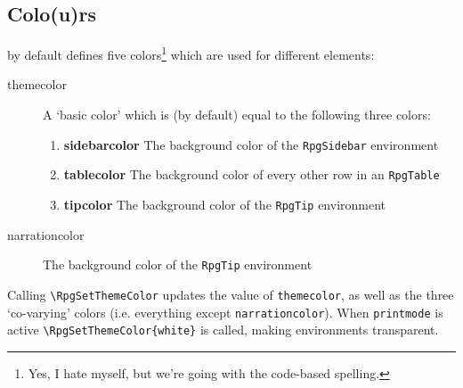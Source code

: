 		\subsection{Colo(u)rs}\label{S:Colors}

			\rpgtex{} by default defines five colors\footnote{Yes, I hate myself, but we're going with the code-based spelling.} which are used for different elements:
			\begin{description}
				\item[themecolor] A `basic color' which is (by default) equal to the following three colors:
				\begin{enumerate}
					\item \textbf{sidebarcolor} The background color of the \verb|RpgSidebar| environment
					\item \textbf{tablecolor} The background color of every other row in an \verb|RpgTable| 
					\item \textbf{tipcolor} The background color of the \verb|RpgTip| environment 
				\end{enumerate} 
				\item[narrationcolor]  The background color of the \verb|RpgTip| environment 
			\end{description}

			Calling \verb|\RpgSetThemeColor|  updates the value of \verb|themecolor|, as well as the three `co-varying' colors (i.e. everything except \verb|narrationcolor|). When \verb|printmode| is active \verb|\RpgSetThemeColor{white}| is called, making environments transparent.
